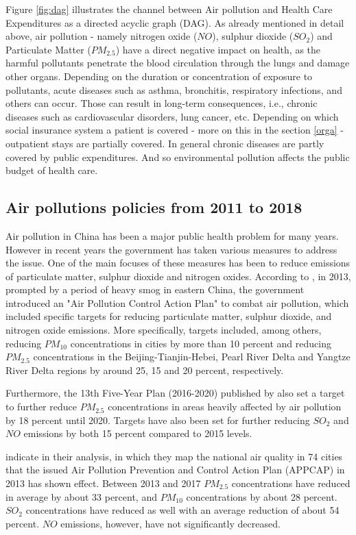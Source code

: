 \documentclass[
]{article}
\begin{document}
Figure \ref{fig:dag} illustrates the channel between Air pollution and Health Care Expenditures as a directed acyclic graph (DAG). As already mentioned in detail above, air pollution - namely nitrogen oxide ($NO$), sulphur dioxide ($SO_2$) and Particulate Matter ($PM_{2.5}$) have a direct negative impact on health, as the harmful pollutants penetrate the blood circulation through the lungs and damage other organs. Depending on the duration or concentration of exposure to pollutants, acute diseases such as asthma, bronchitis, respiratory infections, and others can occur. Those can result in long-term consequences, i.e., chronic diseases such as cardiovascular disorders, lung cancer, etc.  
Depending on which social insurance system a patient is covered - more on this in the section \ref{orga} - outpatient stays are partially covered. In general chronic diseases are partly covered by public expenditures. And so environmental pollution affects the public budget of health care. 
	
	
	\subsection{Air pollutions policies from 2011 to 2018}
	
	Air pollution in China has been a major public health problem for many years. However in recent years the government has taken various measures to address the issue. One of the main focuses of these measures has been to reduce emissions of particulate matter, sulphur dioxide and nitrogen oxides. 
	According to \cite{CHINA2013}, in 2013, prompted by a period of heavy smog in eastern China, the government introduced an "Air Pollution Control Action Plan" to combat air pollution, which included specific targets for reducing particulate matter, sulphur dioxide, and nitrogen oxide emissions. More specifically, targets included, among others, reducing $PM_10$ concentrations in cities by more than 10 percent and reducing $PM_2.5$ concentrations in the Beijing-Tianjin-Hebei, Pearl River Delta and Yangtze River Delta regions by  around 25, 15 and 20 percent, respectively. 
	
	Furthermore, the 13th Five-Year Plan (2016-2020) published by \cite{CHINA2016} also set a target to further reduce $PM_2.5$ concentrations in areas heavily affected by air pollution by 18 percent until 2020. Targets have also been set for further reducing $SO_2$ and $NO$ emissions by both 15 percent compared to 2015 levels. 
	
	\cite{HUANG2018e313} indicate in their analysis, in which they map the national air quality in 74 cities that the issued Air Pollution Prevention and Control Action Plan (APPCAP) in 2013 has shown effect. Between 2013 and 2017 $PM_2.5$ concentrations have reduced in average by about 33 percent, and $PM_10$ concentrations by about 28 percent. $SO_2$ concentrations have reduced as well with an average reduction of about 54 percent. $NO$ emissions, however, have not significantly decreased. 
	
\end{document}
